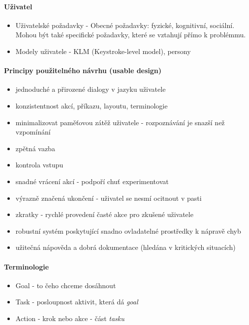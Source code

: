 \paragraph{Uživatel}
\begin{itemize}[itemsep=0px]
\item Uživatelské požadavky - Obecné požadavky: fyzické, kognitivní, sociální. Mohou být také specifické požadavky, které se vztahují přímo k problémmu.
\item Modely uživatele - KLM (Keystroke-level model), persony
\end{itemize}

\paragraph{Principy použitelného návrhu (usable design)}
\begin{itemize}[itemsep=0px]
\item jednoduché a přirozené dialogy v jazyku uživatele
\item konzistentnost akcí, příkazu, layoutu, terminologie
\item minimalizovat paměťovou zátěž uživatele - rozpoznávání je snazší než
vzpomínání
\item zpětná vazba
\item kontrola vstupu
\item snadné vrácení akcí - podpoří chuť experimentovat
\item výrazně značená ukončení - uživatel se nesmí ocitnout v pasti
\item zkratky - rychlé provedení časté akce pro zkušené uživatele
\item robustní systém poskytující snadno ovladatelné prostředky k nápravě chyb
\item užitečná nápověda a dobrá dokumentace (hledána v kritických situacích)
\end{itemize}

\paragraph{Terminologie}
\begin{itemize}[itemsep=0px]
\item Goal - to čeho chceme dosáhnout
\item Task - posloupnost aktivit, která dá \textit{goal}
\item Action - krok nebo akce - část \textit{tasku}
\end{itemize}

